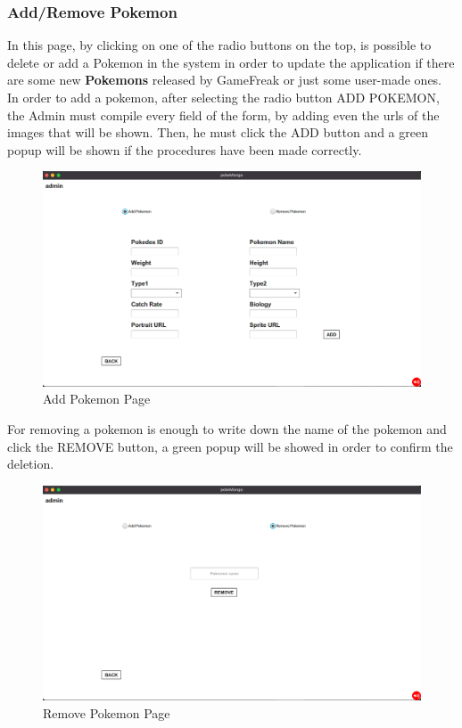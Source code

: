 \subsubsection{Add/Remove Pokemon}
In this page, by clicking on one of the radio buttons on the top, is possible to delete or add a Pokemon in the system in order to update the application if there are some new \textbf{Pokemons} released by GameFreak or just some user-made ones. 
In order to add a pokemon, after selecting the radio button ADD POKEMON, the Admin must compile every field of the form, by adding even the urls of the images that will be shown. Then, he must click the ADD button and a green popup will be shown if the procedures have been made correctly. 
\begin{figure}[H]
	\centering
	\includegraphics[width=\textwidth]{img/userManual/add_pokemon.png}
	\caption{Add Pokemon Page}
\end{figure}
For removing a pokemon is enough to write down the name of the pokemon and click the REMOVE button, a green popup will be showed in order to confirm the deletion.
\begin{figure}[H]
	\centering
	\includegraphics[width=\textwidth]{img/userManual/remove_pokemon.png}
	\caption{Remove Pokemon Page}
\end{figure}
